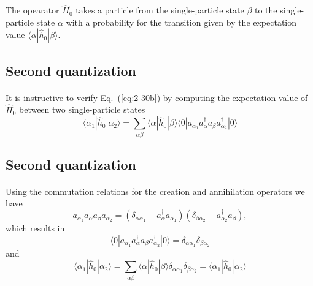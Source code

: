 \documentclass[%
twoside,                 %
final,                   %
10pt]{article}
\begin{document}
The opearator $\hat{H}_0$ takes a particle from the single-particle state $\beta$  to the single-particle state $\alpha$ 
with a probability for the transition given by the expectation value $\langle \alpha|\hat{h}_0|\beta\rangle$.




\subsection{Second quantization}

\paragraph{}
It is instructive to verify Eq.~(\ref{eq:2-30b}) by computing the expectation value of $\hat{H}_0$ 
between two single-particle states
\begin{equation}
	\langle \alpha_1|\hat{h}_0|\alpha_2\rangle = \sum_{\alpha\beta} \langle \alpha|\hat{h}_0|\beta\rangle
		\langle 0|a_{\alpha_1}a_\alpha^{\dagger} a_\beta a_{\alpha_2}^{\dagger}|0\rangle \label{eq:2-30c}
\end{equation}





\subsection{Second quantization}

\paragraph{}
Using the commutation relations for the creation and annihilation operators we have 
\begin{equation}
a_{\alpha_1}a_\alpha^{\dagger} a_\beta a_{\alpha_2}^{\dagger} = (\delta_{\alpha \alpha_1} - a_\alpha^{\dagger} a_{\alpha_1} )(\delta_{\beta \alpha_2} - a_{\alpha_2}^{\dagger} a_{\beta} ), \label{eq:2-30d}
\end{equation}
which results in
\begin{equation}
\langle 0|a_{\alpha_1}a_\alpha^{\dagger} a_\beta a_{\alpha_2}^{\dagger}|0\rangle = \delta_{\alpha \alpha_1} \delta_{\beta \alpha_2} \label{eq:2-30e}
\end{equation}
and
\begin{equation}
\langle \alpha_1|\hat{h}_0|\alpha_2\rangle = \sum_{\alpha\beta} \langle \alpha|\hat{h}_0|\beta\rangle\delta_{\alpha \alpha_1} \delta_{\beta \alpha_2} = \langle \alpha_1|\hat{h}_0|\alpha_2\rangle \label{eq:2-30f}
\end{equation}
\end{document}
